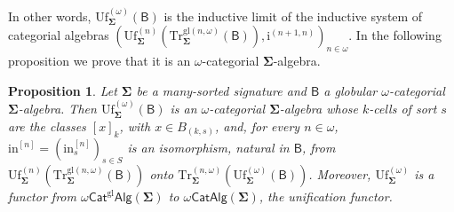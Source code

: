 \documentclass[a4paper, reqno
]{amsart}
\newcommand{\sig}[1]{\mathbf{#1}}             %
\newcommand{\calg}[1]{\boldsymbol{\mathsf{#1}}} %
\newcommand{\gl}{\mathrm{gl}}                %
\newcommand{\Uf}{\mathrm{Uf}}
\newcommand{\Tr}{\mathrm{Tr}}
\theoremstyle{plain}
\newtheorem{proposition}[theorem]{Proposition}
\theoremstyle{definition}
\begin{document}
In other words, $\Uf^{(\omega)}_{\sig{\Sigma}}(\calg{B})$ is the inductive limit of the inductive system of categorial algebras $(\Uf^{(n)}_{\sig{\Sigma}}(\Tr^{\gl(n,\omega)}_{\sig{\Sigma}}(\calg{B})),\mathrm{i}^{(n+1,n)})_{n\in\omega}$.
In the following proposition we prove that it is an $\omega$-categorial $\sig{\Sigma}$-algebra.

\begin{proposition}\label{PUfOmega}
Let $\sig{\Sigma}$ be a many-sorted signature and $\calg{B}$ a globular $\omega$-categorial $\sig{\Sigma}$-algebra.
Then $\Uf^{(\omega)}_{\sig{\Sigma}}(\calg{B})$ is an $\omega$-categorial $\sig{\Sigma}$-algebra whose $k$-cells of sort $s$ are the classes $[x]_{k}$, with $x\in B_{(k,s)}$, and, for every $n\in\omega$, $\mathrm{in}^{[n]}=(\mathrm{in}^{[n]}_{s})_{s\in S}$ is an isomorphism, natural in $\calg{B}$, from $\Uf^{(n)}_{\sig{\Sigma}}(\Tr^{\gl(n,\omega)}_{\sig{\Sigma}}(\calg{B}))$ onto $\Tr^{(n,\omega)}_{\sig{\Sigma}}(\Uf^{(\omega)}_{\sig{\Sigma}}(\calg{B}))$.
Moreover, $\Uf^{(\omega)}_{\sig{\Sigma}}$ is a functor from $\omega\mathsf{Cat}^{\gl}\mathsf{Alg}(\sig{\Sigma})$ to $\omega\mathsf{CatAlg}(\sig{\Sigma})$, the \emph{unification functor}.
\end{proposition}
\end{document}
